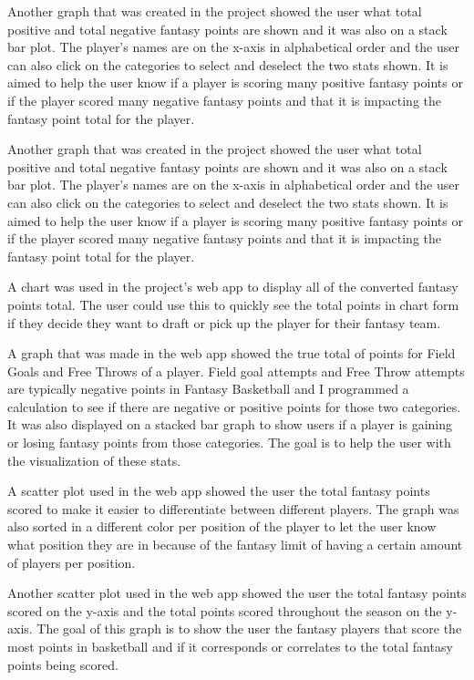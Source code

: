 \documentclass[10pt,twocolumn]{article}
\begin{document}
Another graph that was created in the project showed the user what total positive and total negative fantasy points are shown and it was also on a stack bar plot. The player's names are on the x-axis in alphabetical order and the user can also click on the categories to select and deselect the two stats shown. It is aimed to help the user know if a player is scoring many positive fantasy points or if the player scored many negative fantasy points and that it is impacting the fantasy point total for the player.

Another graph that was created in the project showed the user what total positive and total negative fantasy points are shown and it was also on a stack bar plot. The player's names are on the x-axis in alphabetical order and the user can also click on the categories to select and deselect the two stats shown. It is aimed to help the user know if a player is scoring many positive fantasy points or if the player scored many negative fantasy points and that it is impacting the fantasy point total for the player.

A chart was used in the project's web app to display all of the converted fantasy points total. The user could use this to quickly see the total points in chart form if they decide they want to draft or pick up the player for their fantasy team. 

A graph that was made in the web app showed the true total of points for Field Goals and Free Throws of a player. Field goal attempts and Free Throw attempts are typically negative points in Fantasy Basketball and I programmed a calculation to see if there are negative or positive points for those two categories. It was also displayed on a stacked bar graph to show users if a player is gaining or losing fantasy points from those categories. The goal is to help the user with the visualization of these stats.

A scatter plot used in the web app showed the user the total fantasy points scored to make it easier to differentiate between different players. The graph was also sorted in a different color per position of the player to let the user know what position they are in because of the fantasy limit of having a certain amount of players per position. 

Another scatter plot used in the web app showed the user the total fantasy points scored on the y-axis and the total points scored throughout the season on the y-axis. The goal of this graph is to show the user the fantasy players that score the most points in basketball and if it corresponds or correlates to the total fantasy points being scored.
\end{document}
